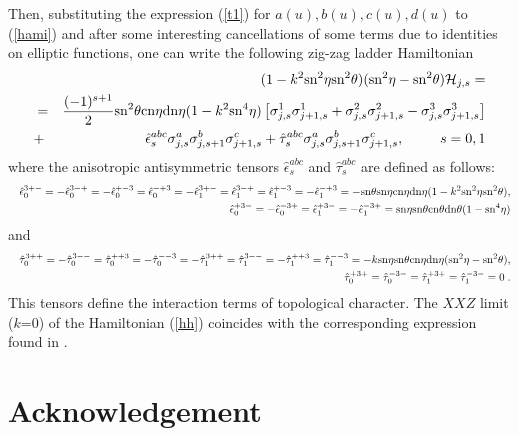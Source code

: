 \documentclass[a4paper,11pt]{article}
\def\sn{{\rm{sn}}}
\def\cn{{\rm{cn}}}
\def\dn{{\rm{dn}}}
\begin{document}
Then, substituting the expression (\ref{t1}) for $a(u),b(u),c(u),d(u)$
to (\ref{hami}) and after some interesting cancellations of some terms
due to identities on elliptic functions, 
one can write the following zig-zag ladder Hamiltonian
\begin{eqnarray}
\label{hh}
&&\hspace{-20mm}
(1-k^2 \sn^2\eta \sn^2\theta)(\sn^2\eta-\sn^2\theta) \cH_{j,s}=\nonumber\\
&=&\frac{(-1)^{s+1}}{2}\sn^2\theta \cn\eta \dn\eta (1-k^2 \sn^4\eta)
\left[\sigma^1_{j,s}\sigma^1_{j+1,s} + 
\sigma^2_{j,s}\sigma^2_{j+1,s}-\sigma^3_{j,s}\sigma^3_{j+1,s}  
\right]\nonumber\\
&+&\hat\epsilon_s^{abc} \sigma_{j,s}^a \sigma_{j,s+1}^b \sigma_{j+1,s}^c
+\hat\tau_s^{abc} \sigma_{j,s}^a \sigma_{j,s+1}^b
\sigma_{j+1,s}^c,\qquad\;\; s=0,1 
\end{eqnarray}
where the anisotropic antisymmetric tensors $\hat\epsilon_s^{abc}$
and $\hat\tau_s^{abc}$ are defined as follows:
\begin{eqnarray}
\label{ee1}
&&\hat\epsilon_0^{3+-} = -\hat\epsilon_0^{3-+}=-
\hat\epsilon_0^{+-3} = \hat\epsilon_0^{-+3}
=-\hat\epsilon_1^{3+-} = \hat\epsilon_1^{3-+}=
\hat\epsilon_1^{+-3} = -\hat\epsilon_1^{-+3} 
=-\sn\theta \sn\eta \cn\eta \dn\eta(1-k^2 \sn^2\eta \sn^2\theta),\nonumber\\
&&\hat\epsilon_0^{+3-} = -\hat\epsilon_0^{-3+}=
\hat\epsilon_1^{+3-} = -\hat\epsilon_1^{-3+}
=\sn\eta \sn\theta \cn\theta \dn\theta (1-\sn^4\eta) 
\end{eqnarray}
and
\begin{eqnarray}
\label{ee2}
&&\hat\tau_0^{3++} = -\hat\tau_0^{3--}=
\hat\tau_0^{++3} = -\hat\tau_0^{--3}
=-\hat\tau_1^{3++} = \hat\tau_1^{3--}=
-\hat\tau_1^{++3} = \hat\tau_1^{--3}=
-k \sn\eta \sn\theta \cn\eta \dn\eta(\sn^2\eta- \sn^2\theta),\nonumber\\
&&\hat\tau_0^{+3+} = \hat\tau_0^{-3-}=
\hat\tau_1^{+3+} = \hat\tau_1^{-3-}=0 \;.
\end{eqnarray}
This tensors define the interaction terms of topological character.
The $XXZ$ limit ($k$=0) of the Hamiltonian (\ref{hh}) coincides with
the corresponding expression found in \cite{APSS}.

\section*{Acknowledgement}
\indent
\end{document}
